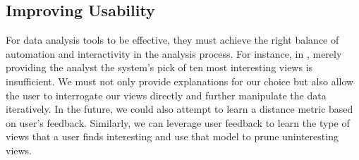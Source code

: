 \subsection{Improving Usability} 
For data analysis tools to be effective,
they must achieve the right balance of automation and interactivity in the analysis
process.
For instance, in \VizRecDB, merely providing the analyst the system's pick of ten
most interesting views is insufficient. 
We must not only provide explanations
for our choice but also allow the user to interrogate our views directly and
further manipulate the data iteratively. 
In the future, we could also attempt to learn a distance metric based on user's
feedback. Similarly, we can leverage user feedback to learn the type of views
that a user finds interesting and use that model to prune uninteresting views.



